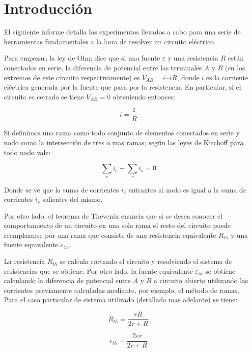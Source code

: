 \documentclass[11pt,a4paper]{article}
\begin{document}
\section{Introducción}\label{sec:intro}
El siguiente informe detalla los experimentos llevados a cabo para una serie de herramientas fundamentales a la hora de resolver un circuito eléctrico. 

Para empezar, la ley de Ohm dice que si una fuente $\varepsilon$ y una resistencia $R$ están conectados en serie, la diferencia de potencial entre las terminales $A$ y $B$ (en los extremos de este circuito respectivamente) es $V_{AB} = \varepsilon –iR$, donde $i$ es la corriente eléctrica generada por la fuente que pasa por la resistencia. En particular, si el circuito es cerrado se tiene $V_{AB}=0$ obteniendo entonces:

\begin{equation}\label{Ohm}
\ i= \frac{\varepsilon}{R}
\end{equation}

Si definimos una rama como todo conjunto de elementos conectados en serie y nodo como la intersección de tres o mas ramas; según las leyes de Kirchoff para todo nodo vale:
 
\begin{equation}\label{nodos}
\ \sum_{e}i_{e}-\sum_{s}i_{s}=0
\end{equation}

Donde se ve que la suma de corrientes $i_{e}$ entrantes al nodo es igual a la suma de corrientes $i_{s}$ salientes del mismo.

Por otro lado, el teorema de Thevenin enuncia que si se desea conocer el comportamiento de un circuito en una sola rama el resto del circuito puede reemplazarse por una rama que consiste de una resistencia equivalente $R_{th}$ y una fuente equivalente $\varepsilon_{th}$.

La resistencia $R_{th}$ se calcula cortando el circuito y resolviendo el sistema de resistencias que se obtiene. Por otro lado, la fuente equivalente $\varepsilon_{th}$ se obtiene calculando la diferencia de potencial entre $A$ y $B$ a circuito abierto utilizando las corrientes previamente calculadas mediante, por ejemplo, el método de ramas. Para el caso particular de sistema utilizado (detallado mas adelante) se tiene:

\begin{equation}\label{Rth}
\ R_{th}= \frac{rR}{2r+R}
\end{equation}

\begin{equation}\label{Eth}
\ \varepsilon_{th}= \frac{2\varepsilon r}{2r+R}
\end{equation}
\end{document}
